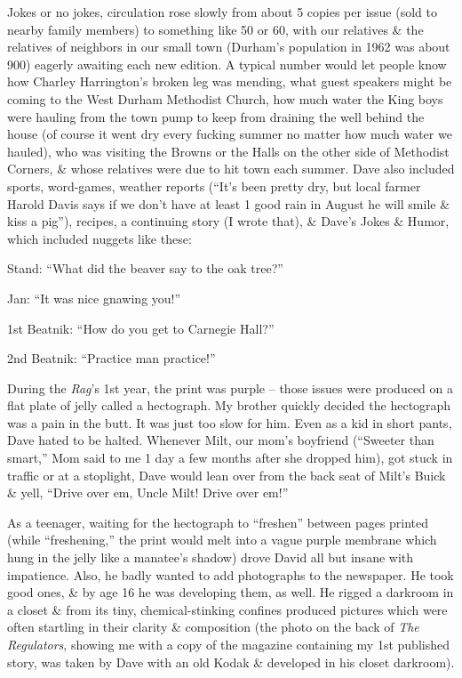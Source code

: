 \documentclass{article}
\numberwithin{equation}{section}
\begin{document}
Jokes or no jokes, circulation rose slowly from about 5 copies per issue (sold to nearby family members) to something like 50 or 60, with our relatives \& the relatives of neighbors in our small town (Durham's population in 1962 was about 900) eagerly awaiting each new edition. A typical number would let people know how Charley Harrington's broken leg was mending, what guest speakers might be coming to the West Durham Methodist Church, how much water the King boys were hauling from the town pump to keep from draining the well behind the house (of course it went dry every fucking summer no matter how much water we hauled), who was visiting the Browns or the Halls on the other side of Methodist Corners, \& whose relatives were due to hit town each summer. Dave also included sports, word-games, weather reports (``It's been pretty dry, but local farmer Harold Davis says if we don't have at least 1 good rain in August he will smile \& kiss a pig''), recipes, a continuing story (I wrote that), \& Dave's Jokes \& Humor, which included nuggets like these:

Stand: ``What did the beaver say to the oak tree?''

Jan: ``It was nice gnawing you!''

1st Beatnik: ``How do you get to Carnegie Hall?''

2nd Beatnik: ``Practice man practice!''

During the \textit{Rag}'s 1st year, the print was purple -- those issues were produced on a flat plate of jelly called a hectograph. My brother quickly decided the hectograph was a pain in the butt. It was just too slow for him. Even as a kid in short pants, Dave hated to be halted. Whenever Milt, our mom's boyfriend (``Sweeter than smart,'' Mom said to me 1 day a few months after she dropped him), got stuck in traffic or at a stoplight, Dave would lean over from the back seat of Milt's Buick \& yell, ``Drive over em, Uncle Milt! Drive over em!''

As a teenager, waiting for the hectograph to ``freshen'' between pages printed (while ``freshening,'' the print would melt into a vague purple membrane which hung in the jelly like a manatee's shadow) drove David all but insane with impatience. Also, he badly wanted to add photographs to the newspaper. He took good ones, \& by age 16 he was developing them, as well. He rigged a darkroom in a closet \& from its tiny, chemical-stinking confines produced pictures which were often startling in their clarity \& composition (the photo on the back of \textit{The Regulators}, showing me with a copy of the magazine containing my 1st published story, was taken by Dave with an old Kodak \& developed in his closet darkroom).
\end{document}
